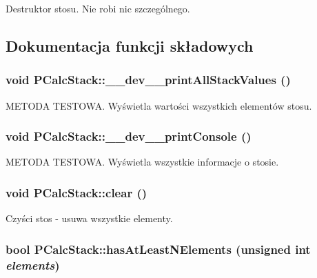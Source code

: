 Destruktor stosu. Nie robi nic szczególnego. 

\subsection{Dokumentacja funkcji składowych}
\hypertarget{classPCalcStack_e28932817d21f528cb3ebe06471df9a2}{
\subsubsection[{\_\-\_\-dev\_\-\_\-printAllStackValues}]{\setlength{\rightskip}{0pt plus 5cm}void PCalcStack::\_\-\_\-dev\_\-\_\-printAllStackValues ()}}
\label{classPCalcStack_e28932817d21f528cb3ebe06471df9a2}


METODA TESTOWA. Wyświetla wartości wszystkich elementów stosu. \hypertarget{classPCalcStack_dbfaddfaadb912324c965390a70ae323}{
\subsubsection[{\_\-\_\-dev\_\-\_\-printConsole}]{\setlength{\rightskip}{0pt plus 5cm}void PCalcStack::\_\-\_\-dev\_\-\_\-printConsole ()}}
\label{classPCalcStack_dbfaddfaadb912324c965390a70ae323}


METODA TESTOWA. Wyświetla wszystkie informacje o stosie. \hypertarget{classPCalcStack_7b1abd7a77db664dcf9e0bd56c17301f}{
\subsubsection[{clear}]{\setlength{\rightskip}{0pt plus 5cm}void PCalcStack::clear ()}}
\label{classPCalcStack_7b1abd7a77db664dcf9e0bd56c17301f}


Czyści stos - usuwa wszystkie elementy. \hypertarget{classPCalcStack_39d4d9e53e8b57fa934ee1a5b9171dc8}{
\subsubsection[{hasAtLeastNElements}]{\setlength{\rightskip}{0pt plus 5cm}bool PCalcStack::hasAtLeastNElements (unsigned int {\em elements})}}
\label{classPCalcStack_39d4d9e53e8b57fa934ee1a5b9171dc8}


